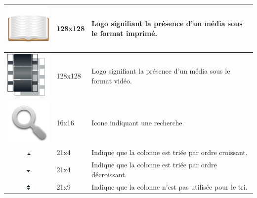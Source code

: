 \documentclass[letter, 11pt]{report}
\begin{document}
\begin{table}[h!tbp]
\begin{center}
\begin{tabular}{|c|l|p{10cm}|}
		\includegraphics[scale=0.3]{imprime.png}         & 128x128          & Logo signifiant la présence d'un média sous le format imprimé. \\ \hline
		\includegraphics[scale=0.3]{video.png}           & 128x128          & Logo signifiant la présence d'un média sous le format vidéo. \\ \hline
		\includegraphics[scale=0.15]{search.png}         & 16x16            & Icone indiquant une recherche. \\ \hline
		\includegraphics{down.png}                       & 21x4             & Indique que la colonne est triée par ordre croissant. \\ \hline
		\includegraphics{up.png}                         & 21x4             & Indique que la colonne est triée par ordre décroissant. \\ \hline
		\includegraphics{upAndDown.png}                  & 21x9             & Indique que la colonne n'est pas utilisée pour le tri. \\ \hline
		\end{tabular}
	\end{center}
\end{table}
\end{document}
